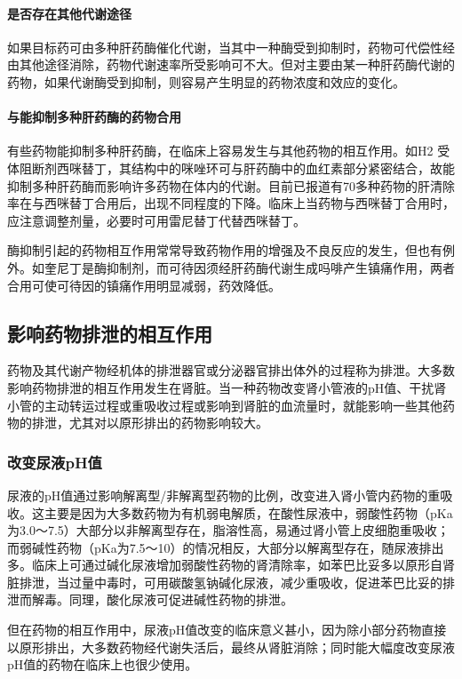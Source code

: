 \paragraph{是否存在其他代谢途径}

如果目标药可由多种肝药酶催化代谢，当其中一种酶受到抑制时，药物可代偿性经由其他途径消除，药物代谢速率所受影响可不大。但对主要由某一种肝药酶代谢的药物，如果代谢酶受到抑制，则容易产生明显的药物浓度和效应的变化。
\paragraph{与能抑制多种肝药酶的药物合用}

有些药物能抑制多种肝药酶，在临床上容易发生与其他药物的相互作用。如H{2}
受体阻断剂西咪替丁，其结构中的咪唑环可与肝药酶中的血红素部分紧密结合，故能抑制多种肝药酶而影响许多药物在体内的代谢。目前已报道有70多种药物的肝清除率在与西咪替丁合用后，出现不同程度的下降。临床上当药物与西咪替丁合用时，应注意调整剂量，必要时可用雷尼替丁代替西咪替丁。

酶抑制引起的药物相互作用常常导致药物作用的增强及不良反应的发生，但也有例外。如奎尼丁是酶抑制剂，而可待因须经肝药酶代谢生成吗啡产生镇痛作用，两者合用可使可待因的镇痛作用明显减弱，药效降低。

\subsection{影响药物排泄的相互作用}

药物及其代谢产物经机体的排泄器官或分泌器官排出体外的过程称为排泄。大多数影响药物排泄的相互作用发生在肾脏。当一种药物改变肾小管液的pH值、干扰肾小管的主动转运过程或重吸收过程或影响到肾脏的血流量时，就能影响一些其他药物的排泄，尤其对以原形排出的药物影响较大。

\subsubsection{改变尿液pH值}

尿液的pH值通过影响解离型/非解离型药物的比例，改变进入肾小管内药物的重吸收。这主要是因为大多数药物为有机弱电解质，在酸性尿液中，弱酸性药物（pKa为3.0～7.5）大部分以非解离型存在，脂溶性高，易通过肾小管上皮细胞重吸收；而弱碱性药物（pKa为7.5～10）的情况相反，大部分以解离型存在，随尿液排出多。临床上可通过碱化尿液增加弱酸性药物的肾清除率，如苯巴比妥多以原形自肾脏排泄，当过量中毒时，可用碳酸氢钠碱化尿液，减少重吸收，促进苯巴比妥的排泄而解毒。同理，酸化尿液可促进碱性药物的排泄。

但在药物的相互作用中，尿液pH值改变的临床意义甚小，因为除小部分药物直接以原形排出，大多数药物经代谢失活后，最终从肾脏消除；同时能大幅度改变尿液pH值的药物在临床上也很少使用。


